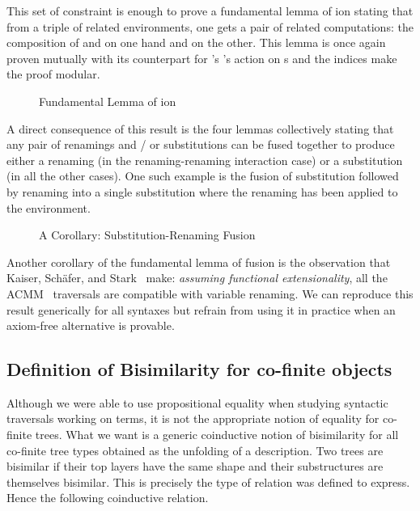 
This set of constraint is enough to prove a fundamental lemma of ion
stating that from a triple of related environments, one gets a pair of related
computations: the composition of  and  on one hand and
 on the other. This lemma is once again proven mutually with its
counterpart for 's 's action on s and the 
indices make the proof modular.

\begin{figure}[h]
\caption{Fundamental Lemma of ion}
\end{figure}

A direct consequence of this result is the four lemmas collectively stating
that any pair of renamings and / or substitutions can be fused together to
produce either a renaming (in the renaming-renaming interaction case) or a
substitution (in all the other cases). One such example is the fusion of
substitution followed by renaming into a single substitution where the
renaming has been applied to the environment.

\begin{figure}[h]
\caption{A Corollary: Substitution-Renaming Fusion}
\end{figure}

Another corollary of the fundamental lemma of fusion is the observation that
Kaiser, Schäfer, and Stark~\citeyear{Kaiser-wsdebr} make: \emph{assuming
functional extensionality}, all the ACMM~\citeyear{allais2017type} traversals
are compatible with variable renaming. We can reproduce this result generically
for all syntaxes but refrain from using it in practice when an axiom-free
alternative is provable.



\subsection{Definition of Bisimilarity for co-finite objects}

Although we were able to use propositional equality when studying
syntactic traversals working on terms, it is not the appropriate
notion of equality for co-finite trees. What we want is a generic
coinductive notion of bisimilarity for all co-finite tree types
obtained as the unfolding of a description. Two trees are bisimilar
if their top layers have the same shape and their substructures are
themselves bisimilar. This is precisely the type of relation 
was defined to express. Hence the following coinductive relation.

